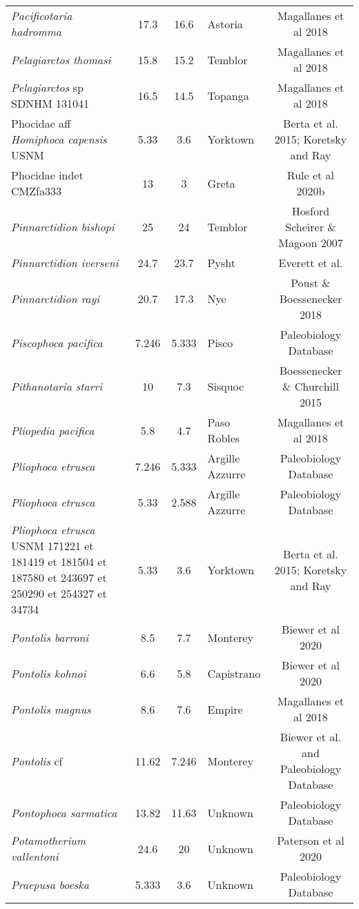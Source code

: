 \begin{longtable}{p{}cclc}
\textit{Pacificotaria hadromma} & 	17.3	&	16.6	&	Astoria	&	Magallanes et al 2018	\\
\textit{Pelagiarctos thomasi} & 	15.8	&	15.2	&	Temblor	&	Magallanes et al 2018	\\
\textit{Pelagiarctos} sp SDNHM 131041 & 	16.5	&	14.5	&	Topanga	&	Magallanes et al 2018	\\
Phocidae aff \textit{Homiphoca capensis} USNM & 	5.33	&	3.6	&	Yorktown	&	Berta et al. 2015; Koretsky and Ray	\\
Phocidae indet CMZfa333 & 	13	&	3	&	Greta	&	Rule et al 2020b	\\
\textit{Pinnarctidion bishopi} & 	25	&	24	&	Temblor	&	Hosford Scheirer \& Magoon 2007	\\
\textit{Pinnarctidion iverseni} & 	24.7	&	23.7	&	Pysht	&	Everett et al.	\\
\textit{Pinnarctidion rayi} & 	20.7	&	17.3	&	Nye	&	Poust \& Boessenecker 2018	\\
\textit{Piscophoca pacifica} & 	7.246	&	5.333	&	Pisco	&	Paleobiology Database	\\
\textit{Pithanotaria starri} & 	10	&	7.3	&	Sisquoc	&	Boessenecker \& Churchill 2015	\\
\textit{Pliopedia pacifica} & 	5.8	&	4.7	&	Paso Robles	&	Magallanes et al 2018	\\
\textit{Pliophoca etrusca} & 	7.246	&	5.333	&	Argille Azzurre	&	Paleobiology Database	\\
\textit{Pliophoca etrusca} & 	5.33	&	2.588	&	Argille Azzurre	&	Paleobiology Database	\\
\textit{Pliophoca etrusca} USNM 171221 et 181419 et 181504 et 187580 et 243697 et 250290 et 254327 et 34734 & 	5.33	&	3.6	&	Yorktown	&	Berta et al. 2015; Koretsky and Ray	\\
\textit{Pontolis barroni} & 	8.5	&	7.7	&	Monterey	&	Biewer et al 2020	\\
\textit{Pontolis kohnoi} & 	6.6	&	5.8	&	Capistrano	&	Biewer et al 2020	\\
\textit{Pontolis magnus} & 	8.6	&	7.6	&	Empire	&	Magallanes et al 2018	\\
\textit{Pontolis} cf & 	11.62	&	7.246	&	Monterey	&	Biewer et al. and Paleobiology Database	\\
\textit{Pontophoca sarmatica} & 	13.82	&	11.63	&	Unknown	&	Paleobiology Database	\\
\textit{Potamotherium vallentoni} & 	24.6	&	20	&	Unknown	&	Paterson et al 2020	\\
\textit{Praepusa boeska} & 	5.333	&	3.6	&	Unknown	&	Paleobiology Database	\\

\end{longtable}
